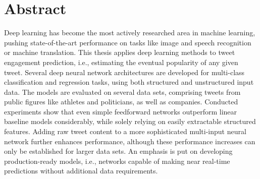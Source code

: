 \section*{Abstract}

Deep learning has become the most actively researched area in machine learning,
pushing state-of-the-art performance on tasks like image and speech recognition
or machine translation.
This thesis applies deep learning methods to tweet engagement prediction, i.e.,
estimating the eventual popularity of any given tweet.
Several deep neural network architectures are developed for multi-class classification
and regression tasks, using both structured and unstructured input data.
The models are evaluated on several data sets, comprising tweets from public
figures like athletes and politicians, as well as companies.
Conducted experiments show that even simple feedforward networks outperform
linear baseline models considerably, while solely relying on easily extractable
structured features.
Adding raw tweet content to a more sophisticated multi-input neural network
further enhances performance, although these performance increases can only
be established for larger data sets.
An emphasis is put on developing production-ready models, i.e., networks
capable of making near real-time predictions without additional data
requirements.
